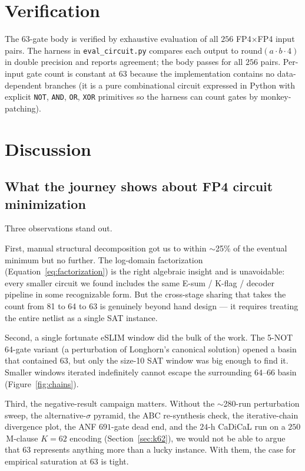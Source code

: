 \documentclass[11pt]{article}
\begin{document}
\section{Verification}

The 63-gate body is verified by exhaustive evaluation of all
$256$ FP4$\times$FP4 input pairs.
The harness in \texttt{eval\_circuit.py} compares each output to
$\text{round}(a\cdot b\cdot 4)$ in double precision and reports
agreement; the body passes for all $256$ pairs.
Per-input gate count is constant at 63 because the implementation
contains no data-dependent branches (it is a pure combinational
circuit expressed in Python with explicit \texttt{NOT}, \texttt{AND},
\texttt{OR}, \texttt{XOR} primitives so the harness can count gates
by monkey-patching).

\section{Discussion}

\subsection{What the journey shows about FP4 circuit minimization}

Three observations stand out.

First, manual structural decomposition got us to within $\sim$25\%
of the eventual minimum but no further. The log-domain factorization
(Equation~\ref{eq:factorization}) is the right algebraic insight
and is unavoidable: every smaller circuit we found includes the
same E-sum / K-flag / decoder pipeline in some recognizable form.
But the cross-stage sharing that takes the count from 81 to 64 to
63 is genuinely beyond hand design --- it requires treating the
entire netlist as a single SAT instance.

Second, a single fortunate eSLIM window did the bulk of the work.
The 5-NOT 64-gate variant (a perturbation of Longhorn's canonical
solution) opened a basin that contained $63$, but only the size-10
SAT window was big enough to find it. Smaller windows iterated
indefinitely cannot escape the surrounding $64$--$66$ basin
(Figure~\ref{fig:chains}).

Third, the negative-result campaign matters. Without the
$\sim$280-run perturbation sweep, the alternative-$\sigma$ pyramid,
the ABC re-synthesis check, the iterative-chain divergence plot,
the ANF $691$-gate dead end, and the $24$-h CaDiCaL run on a
$250$\,M-clause $K{=}62$ encoding (Section~\ref{sec:k62}), we would
not be able to argue that $63$ represents anything more than a
lucky instance. With them, the case for empirical saturation at
$63$ is tight.
\end{document}
